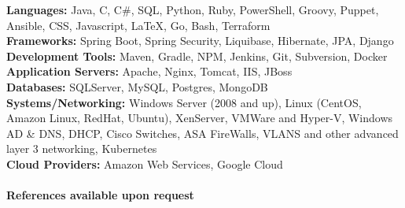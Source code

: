 \documentclass[10pt]{article}
\begin{document}
\normalsize
\textbf{Languages:}
\normalsize Java, C, C{\#}, SQL, Python, Ruby, PowerShell, Groovy, Puppet, Ansible, CSS, Javascript, LaTeX, Go, Bash, Terraform \\
\textbf{Frameworks:}
\normalsize Spring Boot, Spring Security, Liquibase, Hibernate, JPA, Django \\
\textbf{Development Tools:}
\normalsize Maven, Gradle, NPM, Jenkins, Git, Subversion, Docker \\
\textbf{Application Servers:}
\normalsize Apache, Nginx, Tomcat, IIS, JBoss \\
\textbf{Databases:}
\normalsize SQLServer, MySQL, Postgres, MongoDB \\
\textbf{Systems/Networking:}
\normalsize Windows Server (2008 and up), Linux (CentOS, Amazon Linux, RedHat, Ubuntu), XenServer, VMWare and Hyper-V, Windows AD \& DNS, DHCP, 
Cisco Switches, ASA FireWalls, VLANS and other advanced layer 3 networking, Kubernetes \\
\textbf{Cloud Providers:}
\normalsize Amazon Web Services, Google Cloud
\\
\\
\noindent\Large\textbf{References available upon request}
\end{document}
